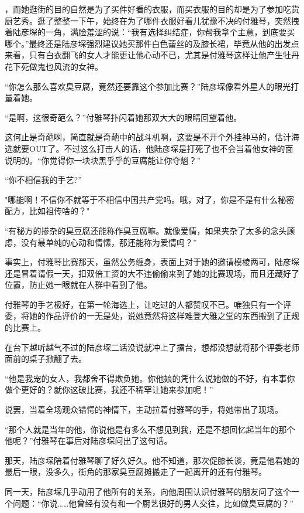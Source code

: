 \documentclass[11pt,a4paper]{article}
\begin{document}
，而她逛街的目的自然是为了买件好看的衣服，而买衣服的目的却是为了参加吃货厨艺秀。逛了整整一下午，始终在为了哪件衣服好看儿犹豫不决的付雅琴，突然拽着陆彦堔的一角，满脸羞涩的说：“我有选择纠结症，你帮我拿个主意，到底要买哪个。”最终还是陆彦堔强烈建议她买那件白色蕾丝的及膝长裙，毕竟从他的出发点来看，只有白衣翻飞的女人才能更让他心动不已，尤其是付雅琴这样让他产生牡丹花下死做鬼也风流的女神。﻿﻿

“你怎么那么喜欢臭豆腐，竟然还要靠这个参加比赛？”陆彦堔像看外星人的眼光打量着她。﻿﻿

“是啊，这很奇葩么？”付雅琴扑闪着她那双大大的眼睛回望着他。﻿﻿

这何止是奇葩啊，简直就是奇葩中的战斗机啊，这要是不开个外挂神马的，估计海选就要OUT了。不过这么打击人的话，他陆彦堔是打死了也不会当着他女神的面说明的。“你觉得你一块块黑乎乎的豆腐能让你夺魁？”﻿﻿

“你不相信我的手艺?”﻿﻿

"哪能啊！不信你不就等于不相信中国共产党吗。哦，对了，你是不是有什么秘密配方，比如祖传啥的？"﻿

“有秘方的掺杂的臭豆腐还能称作臭豆腐嘛。就像爱情，如果夹杂了太多的念头顾虑，没有最单纯的心动和情愫，那还能称为爱情吗？”﻿﻿

事实上，付雅琴比赛那天，虽然公务缠身，表面上对于她的邀请模棱两可，陆彦堔还是冒着请假一天，扣双倍工资的大不违偷偷来到了她的比赛现场，而且还藏好了位置，防止她一眼就在人群中看到了他。﻿﻿

付雅琴的手艺极好，在第一轮海选上，让吃过的人都赞叹不已。唯独只有一个评委，将她的作品评价的一无是处，说她竟然将这样难登大雅之堂的东西搬到了正规的比赛上。﻿﻿

在台下越听越气不过的陆彦堔二话没说就冲上了擂台，想都没想就将那个评委老师面前的桌子掀翻了去。﻿﻿

“他是我宠的女人，我都舍不得欺负她。你他娘的凭什么说她做的不好，有本事你做个更好的？就你这破比赛，我还不稀罕让她来参加呢！”﻿

说罢，当着全场观众错愕的神情下，主动拉着付雅琴的手，将她带出了现场。﻿﻿

“那个人就是当年的他，你说他是有多么不想见到我，还是不想回忆起当年的那个他呢？”付雅琴在事后对陆彦堔问出了这句话。﻿﻿

那天，陆彦堔陪着付雅琴聊了好久好久。他不知道，那次促膝长谈，竟是他看她的最后一眼，没多久，街角的那家臭豆腐摊搬走了一起离开的还有付雅琴。﻿﻿

同一天，陆彦堔几乎动用了他所有的关系，向他周围认识付雅琴的朋友问了这个一个问题：“你说……他曾经有没有和一个厨艺很好的男人交往，比如做臭豆腐的？”﻿﻿
\end{document}
